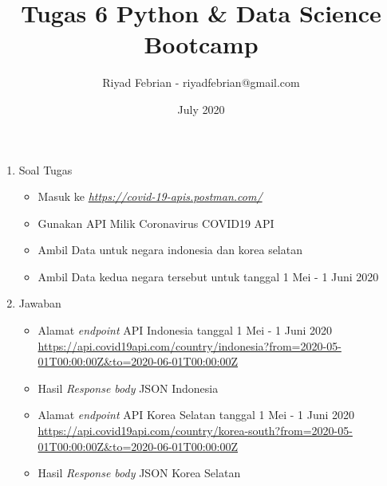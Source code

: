 \documentclass[12pt]{report}
\title{Tugas 6 Python \& Data Science Bootcamp}
\author{Riyad Febrian - riyadfebrian@gmail.com}
\date{July 2020}
\begin{document}
\maketitle

\begin{enumerate}
    \item Soal Tugas
        \begin{itemize}
            \item Masuk ke \emph{\url{https://covid-19-apis.postman.com/}}
            \item Gunakan API Milik Coronavirus COVID19 API
            \item Ambil Data untuk negara indonesia dan korea selatan
            \item Ambil Data kedua negara tersebut untuk tanggal 1 Mei - 1 Juni 2020
        \end{itemize}
    \item Jawaban
    \begin{itemize}
        \item Alamat \emph{endpoint} API Indonesia tanggal 1 Mei - 1 Juni 2020 \\

            \vbox {\url{https://api.covid19api.com/country/indonesia?from=2020-05-01T00:00:00Z&to=2020-06-01T00:00:00Z}}
        
        \item Hasil \emph{Response body} JSON Indonesia \\
              
        
        \item Alamat \emph{endpoint} API Korea Selatan tanggal 1 Mei - 1 Juni 2020 \\
        
           \vbox {\url{https://api.covid19api.com/country/korea-south?from=2020-05-01T00:00:00Z&to=2020-06-01T00:00:00Z}}
        
        \item Hasil \emph{Response body} JSON Korea Selatan \\
        
            
    \end{itemize}

\end{enumerate}
\end{document}
